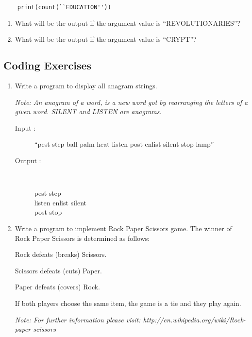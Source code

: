 \documentclass[11pt,a4paper]{article}
\def\AnswerBox{\fbox{\begin{minipage}{4in}\hfill\vspace{0.5in}\end{minipage}}}
\begin{document}
\begin{enumerate}[label=\bfseries Program \arabic*:]
\begin{lstlisting}
    print(count(``EDUCATION''))    
    \end{lstlisting}
    \AnswerBox
    \begin{enumerate}[label=\bfseries Q\arabic*:]\itemsep10pt
         \item What will be the output if the argument value is ``REVOLUTIONARIES''?
         \item What will be the output if the argument value is ``CRYPT''?
    \end{enumerate}
    \end{enumerate}
    
\subsection*{Coding Exercises}
\begin{enumerate}
    \item Write a program to display all anagram strings.

    \emph{Note: An anagram of a word, is a new word got by rearranging the letters of a given word. SILENT and LISTEN are anagrams.}
     \begin{description}
     \item [Input :]  ``pest step ball palm heat listen post enlist silent stop lamp''
     \item [Output :]\

           pest step\\
           listen enlist silent\\
           post stop
     \end{description} 
     \item Write a program to implement Rock Paper Scissors game.
      The winner of Rock Paper Scissors is determined as follows:

       Rock defeats (breaks) Scissors.

       Scissors defeats (cuts) Paper.

       Paper defeats (covers) Rock.
    
       If both players choose the same item, the game is a tie and they play again.

       \emph{Note: For further information please visit: http://en.wikipedia.org/wiki/Rock-paper-scissors}
\end{enumerate}
\end{document}
